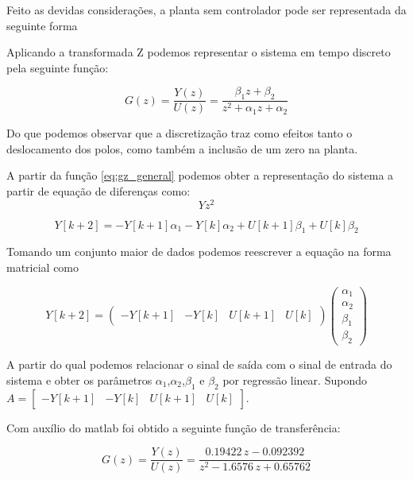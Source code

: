 \documentclass[a4paper,11pt]{article}
\begin{document}
Feito as devidas considerações, a planta sem controlador pode ser representada da seguinte forma


Aplicando a transformada Z podemos representar o sistema em tempo discreto pela seguinte função:

\begin{equation}\label{eq:gz_general}
    G(z) = \frac{Y(z)}{U(z)} = \frac{\beta_1 z + \beta_2}{z^2 + \alpha_1 z + \alpha_2}
\end{equation}

Do que podemos observar que a discretização traz como efeitos tanto o deslocamento dos polos, como também a inclusão de um zero na planta.

A partir da função \ref{eq:gz_general} podemos obter a representação do sistema a partir de equação de diferenças como:
$$
Y z^2
$$

\begin{equation}\label{eq:gz_general}
  Y[k+2] = -Y[k+1]\alpha_1 - Y[k]\alpha_2 + U[k+1]\beta_1 + U[k]\beta_2
\end{equation}

Tomando um conjunto maior de dados podemos reescrever a equação na forma matricial como

\begin{equation}\label{eq:gz_general}
  Y[k+2] = 
  \left( \begin{array}{cccc}
  -Y[k+1] & -Y[k] & U[k+1] & U[k]
  \end{array} \right)
  \left(\begin{array}{c}
    \alpha_1\\ \alpha_2 \\ \beta_1 \\ \beta_2
  \end{array}\right)
\end{equation}

A partir do qual podemos relacionar o sinal de saída com o sinal de entrada do sistema e obter os parâmetros $\alpha_1$,$\alpha_2$,$\beta_1$ e $\beta_2$ por regressão linear. Supondo 
$A = \left[\begin{array}{cccc}
 -Y[k+1] & -Y[k] & U[k+1] & U[k]
\end{array}\right]$.

Com auxílio do matlab foi obtido a seguinte função de transferência:

\begin{equation}
G(z) = \frac{Y(z)}{U(z)} = \frac{0.19422\,z-0.092392}{z^2-1.6576\,z+0.65762}
\end{equation}
\end{document}
